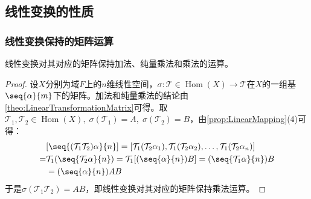 \subsection{线性变换的性质}
\subsubsection{线性变换保持的矩阵运算}
\begin{theorem}
	线性变换对其对应的矩阵保持加法、纯量乘法和乘法的运算。
\end{theorem}
\begin{proof}
	设$X$分别为域$F$上的$n$维线性空间，$\sigma:\mathcal{T}\in\operatorname{Hom}(X)\longrightarrow\mathcal{T}$在$X$的一组基$\seq{\alpha}{m}$下的矩阵。加法和纯量乘法的结论由\cref{theo:LinearTransformationMatrix}可得。取$\mathcal{T}_1,\mathcal{T}_2\in\operatorname{Hom}(X),\;\sigma(\mathcal{T}_1)=A,\;\sigma(\mathcal{T}_2)=B$，由\cref{prop:LinearMapping}(4)可得：
	\begin{align*}
		&[\seq{(\mathcal{T}_1\mathcal{T}_2)\alpha}{n}]
		=[\mathcal{T}_1(\mathcal{T}_2\alpha_1),\mathcal{T}_1(\mathcal{T}_2\alpha_2),\dots,\mathcal{T}_1(\mathcal{T}_2\alpha_n)] \\
		=&\mathcal{T}_1(\seq{\mathcal{T}_2\alpha}{n}) =\mathcal{T}_1[(\seq{\alpha}{n})B] =(\seq{\mathcal{T}_1\alpha}{n})B \\
		&=(\seq{\alpha}{n})AB
	\end{align*}
	于是$\sigma(\mathcal{T}_1\mathcal{T}_2)=AB$，即线性变换对其对应的矩阵保持乘法运算。
\end{proof}
